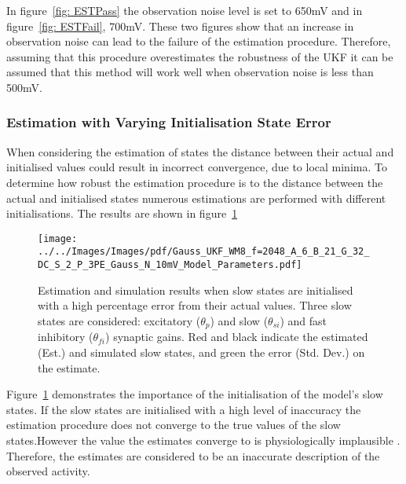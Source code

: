 
In figure~\ref{fig: ESTPass} the observation noise level is set to 650mV and in figure~\ref{fig: ESTFail}, 700mV. These two figures show that an increase in observation noise can lead to the failure of the estimation procedure. Therefore, assuming that this procedure overestimates the robustness of the UKF it can be assumed that this method will work well when observation noise is less than 500mV.

\subsubsection{Estimation with Varying Initialisation State Error}

When considering the estimation of states the distance between their actual and initialised values could result in incorrect convergence, due to local minima. To determine how robust the estimation procedure is to the distance between the actual and initialised states numerous estimations are performed with different initialisations. The results are shown in figure~\ref{fig: EstInitFail}
\begin{figure}%
	\centering
		\texttt{[image: ../../Images/Images/pdf/Gauss\_UKF\_WM8\_f=2048\_A\_6\_B\_21\_G\_32\_DC\_S\_2\_P\_3PE\_Gauss\_N\_10mV\_Model\_Parameters.pdf]}
	\caption{Estimation and simulation results when slow states are initialised with a high percentage error from their actual values. Three slow states are considered: excitatory ($\theta_{p}$) and slow ($\theta_{si}$) and fast inhibitory ($\theta_{fi}$) synaptic gains. Red and black indicate the estimated (Est.) and simulated slow states, and green the error (Std. Dev.) on the estimate.}
	\label{fig: EstInitFail}
\end{figure}%


Figure~\ref{fig: EstInitFail} demonstrates the importance of the initialisation of the model's slow states. If the slow states are initialised with a high level of inaccuracy the estimation procedure does not converge to the true values of the slow states.However the value the estimates converge to is physiologically implausible . Therefore, the estimates are considered to be an inaccurate description of the observed activity.

